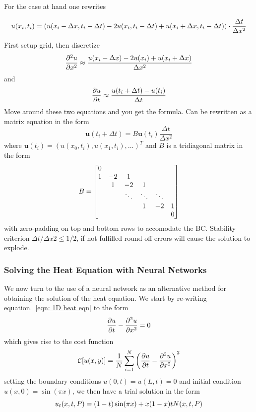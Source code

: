 \documentclass[reprint, english, nofootinbib]{revtex4-2}
\begin{document}
For the case at hand one rewrites 
\begin{widetext}
\begin{equation}
    u(x_i,t_i) = \qty(u(x_i - \Delta x,t_i - \Delta t) - 
                 2u(x_i,t_i-\Delta t) + 
                 u(x_i+\Delta x,t_i-\Delta t)) \cdot \frac{\Delta t}{\Delta x^2} 
\end{equation}
\end{widetext}
First setup grid, then discretize 
\begin{equation}
   \pdv[2]{u}{x} \approx \frac{u(x_i-\Delta x)-2u(x_i) + u(x_i+\Delta x)}{\Delta x^2} 
\end{equation}
and
\begin{equation}
    \pdv{u}{t} \approx \frac{u(t_i + \Delta t) - u(t_{i})}{\Delta t}
\end{equation}
Move around these two equations and you get the formula. Can be rewritten as a matrix equation in the form
\begin{equation}
    \pmb u(t_i+\Delta t) = B \pmb u(t_i) \frac{\Delta t}{\Delta x^2}
\end{equation}
where $\pmb u(t_i) = (u(x_0, t_i), u(x_1, t_i), \dots)^T$ and $B$ is a tridiagonal matrix in the form
\begin{equation} \label{eqn: Az = b}
    B = \qty[
    \begin{matrix}
    0 \\
    1 & -2 & 1 \\
    & 1 & -2 & 1 \\
    && \ddots & \ddots & \ddots \\
    &&& 1 & -2 & 1 \\
    &&&&& 0
    \end{matrix}
    ]
 \end{equation}
with zero-padding on top and bottom rows to accomodate the BC. Stability criterion $\Delta t/\Delta x2 \leq 1/2$, if not fulfilled round-off errors will cause the solution to explode. 

\subsubsection{Solving the Heat Equation with Neural Networks}
\noindent
We now turn to the use of a neural network as an alternative method for obtaining the solution of the heat equation. We start by re-writing equation.~\ref{eqn: 1D heat eqn} to the form
\begin{equation}
    \pdv{u}{t} - \pdv[2]{u}{x} = 0
\end{equation}
which gives rise to the cost function 
\begin{equation}
    \mathcal C\qty[u\qty(x, y)] = \frac{1}{N}\sum_{i=1}^N \qty(\pdv{u}{t} - \pdv[2]{u}{x})^2
\end{equation}
setting the boundary conditions $u(0, t) = u(L, t) = 0$ and initial condition $u(x, 0) = \sin(\pi x)$, we then have a trial solution in the form
\begin{equation}
    u_t(x, t, P) = \qty(1 - t)\sin(\pi x) + x(1 - x)t N(x, t, P)
\end{equation}
\end{document}
